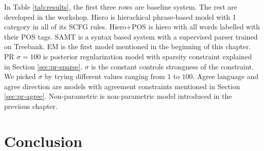 In Table \ref{tab:results}, the first three rows
are baseline system. The rest are developed in the workshop.
Hiero is hierachical phrase-based
model with 1 category in all of its SCFG rules. Hiero+POS
is hiero with all words labelled with their POS tags.
SAMT is a syntax based system with a supervised
parser trained on Treebank. EM is the first model mentioned
in the beginning of this chapter. PR $\sigma=100$ is 
posterior regularization model with sparsity constraint
explained in Section \ref{sec:pr-sparse}.
$\sigma$ is the constant controls strongness of the constraint.
We picked $\sigma$ by trying different values ranging from 
$1$ to $100$.
Agree language and agree direction are models with agreement 
constraints mentioned in Section \ref{sec:pr-agree}. Non-parametric
is non-parametric model introduced in the previous chapter.
\section{Conclusion}
